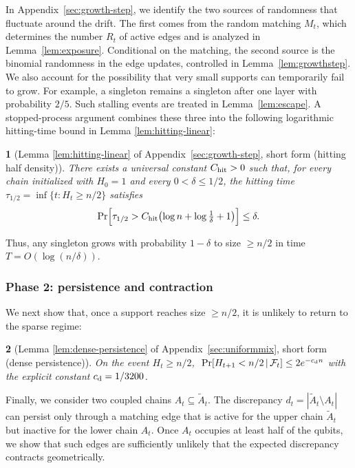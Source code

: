 \documentclass[
    aps,
    superscriptaddress,
    onecolumn,
    10pt,
    prx,
    nofootinbib
]{revtex4-2}
\theoremstyle{namedstatement}
\newtheorem*{namedstatementInner}{}
\theoremstyle{plain}
\newenvironment{restatement}[1]{%
    \begin{namedstatementInner}[#1]%
}{%
    \end{namedstatementInner}%
}
\begin{document}
In Appendix~\ref{sec:growth-step}, we identify the two sources of randomness that fluctuate around the drift. The first comes from the random matching $M_t$, which determines the number $R_t$ of active edges and is analyzed in Lemma~\ref{lem:exposure}. Conditional on the matching, the second source is the binomial randomness in the edge updates, controlled in Lemma~\ref{lem:growthstep}. We also account for the possibility that very small supports can temporarily fail to grow. For example, a singleton remains a singleton after one layer with probability $2/5$. Such stalling events are treated in Lemma~\ref{lem:escape}. A stopped-process argument combines these three into the following logarithmic hitting-time bound in Lemma \ref{lem:hitting-linear}:

\begin{restatement}{Lemma \ref{lem:hitting-linear} of Appendix~\ref{sec:growth-step}, short form (hitting half density)}
There exists a universal constant $C_{\rm hit}>0$ such that, for every chain initialized with $H_{0}=1$ and every $0<\delta\leq1/2$, the hitting time
$\tau_{1/2}=\inf\{t:H_{t}\geq n/2\}$ satisfies
\begin{equation}\label{eq:hitting}
 \Pr\Bigl[\tau_{1/2}>C_{\rm hit}\bigl(\log n+\log\tfrac1\delta+1\bigr)\Bigr]\leq\delta.
\end{equation}
\end{restatement}
Thus, any singleton grows with probability $1-\delta$ to size $\geq n/2$ in time $T=O(\log(n/\delta))$.

\subsubsection{Phase 2: persistence and contraction}

We next show that, once a support reaches size $\geq n/2$, it is unlikely to return to the sparse regime: 

\begin{restatement}{Lemma \ref{lem:dense-persistence} of Appendix~\ref{sec:uniformmix}, short form (dense persistence)}
On the event $H_{t}\geq n/2$,
$\ \Pr[H_{t+1}<n/2\,|\,\mathcal{F}_{t}]\leq2e^{-c_{\rm d}n}$ with the
explicit constant $c_{\rm d}=1/3200$.
\end{restatement}

Finally, we consider two coupled chains
$A_{t}\subseteq\widetilde{A}_{t}$. The discrepancy $d_{t}=|\widetilde{A}_{t}\setminus A_{t}|$ can persist only through a matching edge that is active for the upper chain $\widetilde A_t$ but inactive for the lower chain $A_t$. Once $A_t$ occupies at least half of the qubits, we show that such edges are sufficiently unlikely that the expected discrepancy contracts geometrically.
\end{document}
